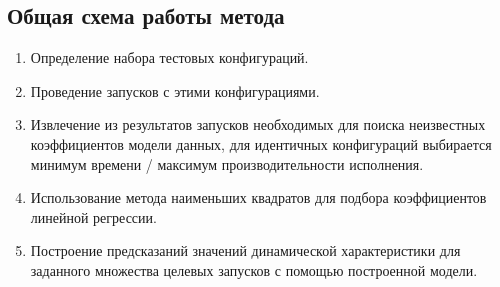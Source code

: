 	\subsection{Общая схема работы метода}
		\begin{enumerate}[I]
		\item Определение набора тестовых конфигураций.
		\item Проведение запусков с этими конфигурациями.
		\item Извлечение из результатов запусков необходимых для поиска неизвестных коэффициентов модели данных, для идентичных конфигураций выбирается минимум времени / максимум производительности исполнения.
		\item Использование метода наименьших квадратов для подбора коэффициентов линейной регрессии.
		\item Построение предсказаний значений динамической характеристики для заданного множества целевых запусков с помощью построенной модели.
		\end{enumerate}
		
\clearpage
